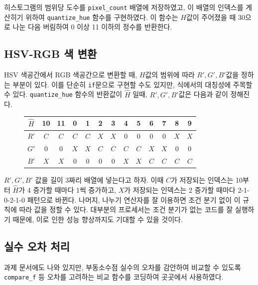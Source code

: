 \documentclass[titlepage]{article}
\begin{document}
히스토그램의 범위당 도수를 \texttt{pixel\_count} 배열에 저장하였고, 이 배열의 인덱스를 계산히기 위하여 \texttt{quantize\_hue} 함수를 구현하였다. 이 함수는 \(H\)값이 주어졌을 때 30으로 나눈 다음 버림하여 0 이상 11 이하의 정수를 반환한다.

\subsection{HSV-RGB 색 변환}

HSV 색공간에서 RGB 색공간으로 변환할 때, \(H\)값의 범위에 따라 \(R', G', B'\)값을 정하는 부분이 있다. 이를 단순히 \texttt{if}문으로 구현할 수도 있지만, 식에서의 대칭성에 주목할 수 있다. \texttt{quantize\_hue} 함수의 반환값이 \(\hat{H}\) 일때, \(R', G', B'\)값은 다음과 같이 정해진다.

\begin{figure}[H]
  \centering
  \begin{tabular}{|c|cccccccccccc|}
    \hline
    \(\hat{H}\) & 10    & 11    & 0     & 1     & 2     & 3     & 4     & 5     & 6     & 7     & 8     & 9     \\
    \hline
    \(R'\)      & \(C\) & \(C\) & \(C\) & \(C\) & \(X\) & \(X\) & 0     & 0     & 0     & 0     & \(X\) & \(X\) \\
    \(G'\)      & 0     & 0     & \(X\) & \(X\) & \(C\) & \(C\) & \(C\) & \(C\) & \(X\) & \(X\) & 0     & 0     \\
    \(B'\)      & \(X\) & \(X\) & 0     & 0     & 0     & 0     & \(X\) & \(X\) & \(C\) & \(C\) & \(C\) & \(C\) \\
    \hline
  \end{tabular}
\end{figure}

\(R', G', B'\) 값을 길이 3짜리 배열에 넣는다고 하자. 이때 \(C\)가 저장되는 인덱스는 10부터 \(\hat{H}\)가 4 증가할 때마다 1씩 증가하고, \(X\)가 저장되는 인덱스는 2 증가할 때마다 2-1-0-2-1-0 패턴으로 바뀐다. 나머지, 나누기 연산자를 잘 이용하면 조건 분기 없이 이 규칙에 따라 값을 정할 수 있다. 대부분의 프로세서는 조건 분기가 없는 코드를 잘 실행하기 때문에, 이로 인한 성능 향상까지도 기대할 수 있을 것이다.

\subsection{실수 오차 처리}

과제 문서에도 나와 있지만, 부동소수점 실수의 오차를 감안하여 비교할 수 있도록 \texttt{compare\_f} 등 오차를 고려하는 비교 함수를 코딩하여 곳곳에서 사용하였다.
\end{document}
